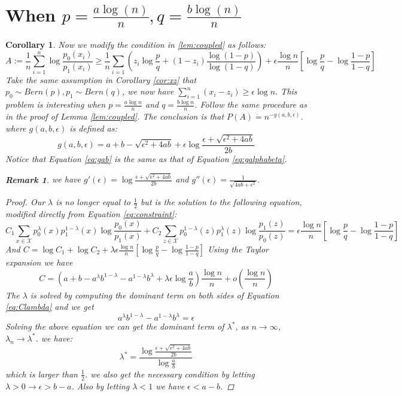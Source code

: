 \documentclass{article}
\newtheorem{remark}{Remark}
\newtheorem{corollary}{Corollary}
\newcommand{\A}{\frac{a \log(n)}{n}}
\newcommand{\B}{\frac{b \log(n)}{n}}
\begin{document}
\section{When $p=\A, q=\B$}
\begin{corollary}\label{cor:decrease}
	Now we modify the condition in \ref{lem:coupled} as follows:
	$$
	A := \frac{1}{n}\sum_{i=1}^n \log \frac{p_0(x_i)}{p_1(x_i)} \geq \frac{1}{n} \sum_{i=1}(z_i \log\frac{p}{q} +(1-z_i) \frac{\log(1-p)}{\log(1-q)}) + \epsilon\frac{\log n }{n} [\log \frac{p}{q} - \log \frac{1-p}{1-q}]
	$$
	Take the same assumption in Corollary \ref{cor:xz} that
	$p_0 \sim Bern(p), p_1 \sim Bern(q)$, we now have $\sum_{i=1}^n (x_i - z_i) \geq \epsilon \log n$.
	This problem is interesting when
	$ p = \frac{a \log n }{n} $ and $ q = \frac{b \log n }{n}$. Follow the same procedure as
	in the proof of Lemma \ref{lem:coupled}. The conclusion is that $P(A) \dot{=} n^{-g(a,b,\epsilon)}$.
	where $g(a,b,\epsilon)$ is defined as:
	\begin{equation}\label{eq:gab}
	g(a,b,\epsilon) = a + b - \sqrt{\epsilon^2 + 4ab} + \epsilon \log \frac{\epsilon + \sqrt{\epsilon^2 + 4ab}}{2b}
	\end{equation}
	Notice that Equation \eqref{eq:gab} is the same as that of Equation \eqref{eq:galphabeta}.
	\begin{remark}
		we have $g'(\epsilon) = \log \frac{\epsilon + \sqrt{\epsilon^2 + 4ab}}{2b}$ and $g''(\epsilon ) = \frac{1}{\sqrt{4ab + \epsilon^2}}$.
		\end{remark}
	\begin{proof}
	Our $\lambda$ is no longer equal to $\frac{1}{2}$ but is the solution to the following equation, modified directly from Equation \eqref{eq:constraint}:
	\begin{equation}\label{eq:Clambda}
	C_1 \sum_{x\in \mathcal{X}} p_0^{\lambda}(x)p_1^{1-\lambda}(x)\log\frac{p_0(x)}{p_1(x)} + C_2 \sum_{z\in \mathcal{X}} p_0^{1-\lambda}(z)p_1^{\lambda}(z)\log\frac{p_1(z)}{p_0(z)}= \epsilon\frac{\log n }{n} [\log \frac{p}{q} - \log \frac{1-p}{1-q}]
	\end{equation}
	And $C= \log C_1 + \log C_2 + \lambda \epsilon\frac{\log n }{n} [\log \frac{p}{q} - \log \frac{1-p}{1-q}]$
	Using the Taylor expansion we have
	$$
	C = (a + b - a^{\lambda}b^{1-\lambda} - a^{1-\lambda}b^{\lambda} + \lambda \epsilon \log\frac{a}{b}) \frac{\log n }{n}
	+ o(\frac{\log n}{n})
	$$
	The $\lambda$ is solved by computing the dominant term on both sides of Equation \eqref{eq:Clambda} and we get
	\begin{equation}
	 a^{\lambda}b^{1-\lambda} - a^{1-\lambda}b^{\lambda} = \epsilon
	\end{equation}
	Solving the above equation we can get the dominant term of $\lambda^*$, as $n\to \infty$, $\lambda_n \to \lambda^*$.
	we have:
	\begin{equation}
	\lambda^*= \frac{
				\log \frac{ 
			\epsilon + \sqrt{\epsilon^2 + 4 ab }	
			} { 2b}
	}
	{\log \frac{a}{b}}
	\end{equation}
	which is larger than $\frac{1}{2}$. we also get the necessary condition by letting $\lambda > 0 \rightarrow \epsilon > b - a$.  Also by letting $\lambda < 1$ we have $\epsilon < a - b$.
	\end{proof}
\end{corollary}
\end{document}
